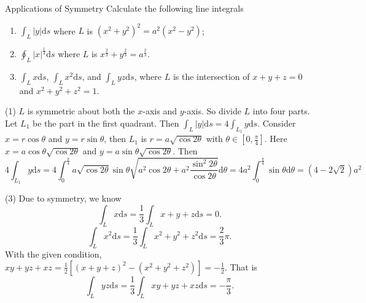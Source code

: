 \begin{example}{Applications of Symmetry}{}
  Calculate the following line integrals
  \begin{enumerate}
  \item $\int_L|y|\mathrm{d} s$ where $L$ is $(x^2 + y^2)^2 = a^2(x^2 - y^2)$;
  \item $\oint _L|x|^{\frac{1}{3}}\mathrm{d} s$ where
    $L$ is $x^{\frac{2}{3}} + y^{\frac{2}{3}} = a^{\frac{2}{3}}$.
  \item $\int_L x\mathrm{d} s$, $\int_L x^2\mathrm{d} s$, and
    $\int_Lyz\mathrm{d}s$, where $L$ is the intersection of
    $x+y+z=0$ and $x^2+y^2+z^2 = 1$.
  \end{enumerate}
\end{example}

\begin{solution}
  (1) $L$ is symmetric about both the $x$-axis and $y$-axis.
  So divide $L$ into four parts. Let $L_1$ be the part in the first quadrant.
  Then $\int_L|y|\mathrm{d}s = 4\int_{L_1}y \mathrm{d} s$.
  Consider $x = r \cos \theta$ and $y = r \sin \theta$, then $L_1$ is $r = a
  \sqrt{\cos 2\theta}$ with $\theta \in [0, \frac{\pi}{4}]$.
  Here $x = a \cos \theta \sqrt{\cos 2\theta}$ and $y = a \sin \theta \sqrt{\cos
  2\theta}$. Then
  \begin{equation}
    4\int_{L_1}y\mathrm{d} s
    = 4 \int_0^{\frac{\pi}{4}} a \sqrt{\cos 2\theta} \sin \theta \sqrt{a^2 \cos 2\theta + a^2 \frac{\sin^2 2\theta}{\cos 2\theta}} \mathrm{d} \theta
    = 4 a^2 \int_0^{\frac{\pi}{4}} \sin \theta \mathrm{d} \theta = (4 - 2 \sqrt{2})a^2
  \end{equation}

  (3) Due to symmetry, we know
  \begin{equation}
    \int_L x \mathrm{d} s = \frac{1}{3} \int_{L} x+y+z\mathrm{d} s = 0.
  \end{equation}
  \begin{equation}
    \int_Lx^2\mathrm{d} s = \frac{1}{3} \int_L x^2 + y^2 + z^2 \mathrm{d} s
    = \frac{2}{3}\pi.
  \end{equation}
  With the given condition,
  $xy + yz + xz = \frac{1}{2}\left[ (x+y+z)^2 - (x^2 + y^2 + z^2) \right] = - \frac{1}{2}$.
  That is
  \begin{equation}
    \int_L yz \mathrm{d} s = \frac{1}{3} \int_L xy + yz + xz \mathrm{d} s
    = - \frac{\pi}{3}.
  \end{equation}
\end{solution}


